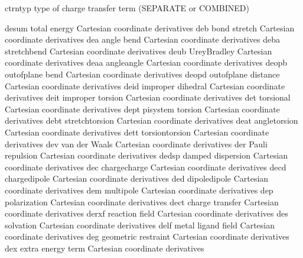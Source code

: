 \documentclass[letterpaper,11pt,english]{sphinxmanual}
\begin{document}
\sphinxAtStartPar
{}

\begin{sphinxVerbatim}[commandchars=\\\{\}]
ctrntyp         type of charge transfer term (SEPARATE or COMBINED)
\end{sphinxVerbatim}

\sphinxAtStartPar
{}

\begin{sphinxVerbatim}[commandchars=\\\{\}]
desum           total energy Cartesian coordinate derivatives
deb             bond stretch Cartesian coordinate derivatives
dea             angle bend Cartesian coordinate derivatives
deba            stretch\PYGZhy{}bend Cartesian coordinate derivatives
deub            Urey\PYGZhy{}Bradley Cartesian coordinate derivatives
deaa            angle\PYGZhy{}angle Cartesian coordinate derivatives
deopb           out\PYGZhy{}of\PYGZhy{}plane bend Cartesian coordinate derivatives
deopd           out\PYGZhy{}of\PYGZhy{}plane distance Cartesian coordinate derivatives
deid            improper dihedral Cartesian coordinate derivatives
deit            improper torsion Cartesian coordinate derivatives
det             torsional Cartesian coordinate derivatives
dept            pi\PYGZhy{}system torsion Cartesian coordinate derivatives
debt            stretch\PYGZhy{}torsion Cartesian coordinate derivatives
deat            angle\PYGZhy{}torsion Cartesian coordinate derivatives
dett            torsion\PYGZhy{}torsion Cartesian coordinate derivatives
dev             van der Waals Cartesian coordinate derivatives
der             Pauli repulsion Cartesian coordinate derivatives
dedsp           damped dispersion Cartesian coordinate derivatives
dec             charge\PYGZhy{}charge Cartesian coordinate derivatives
decd            charge\PYGZhy{}dipole Cartesian coordinate derivatives
ded             dipole\PYGZhy{}dipole Cartesian coordinate derivatives
dem             multipole Cartesian coordinate derivatives
dep             polarization Cartesian coordinate derivatives
dect            charge transfer Cartesian coordinate derivatives
derxf           reaction field Cartesian coordinate derivatives
des             solvation Cartesian coordinate derivatives
delf            metal ligand field Cartesian coordinate derivatives
deg             geometric restraint Cartesian coordinate derivatives
dex             extra energy term Cartesian coordinate derivatives
\end{sphinxVerbatim}
\end{document}
